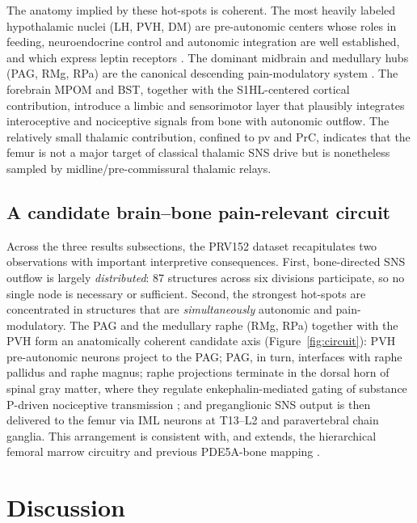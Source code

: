 \documentclass[11pt]{article}
\begin{document}
The anatomy implied by these hot-spots is coherent. The most heavily labeled hypothalamic nuclei (LH, PVH, DM) are pre-autonomic centers whose roles in feeding, neuroendocrine control and autonomic integration are well established, and which express leptin receptors \citep{flak2016cns}. The dominant midbrain and medullary hubs (PAG, RMg, RPa) are the canonical descending pain-modulatory system \citep{francois2017brainstem,heinricher2009descending}. The forebrain MPOM and BST, together with the S1HL-centered cortical contribution, introduce a limbic and sensorimotor layer that plausibly integrates interoceptive and nociceptive signals from bone with autonomic outflow. The relatively small thalamic contribution, confined to pv and PrC, indicates that the femur is not a major target of classical thalamic SNS drive but is nonetheless sampled by midline/pre-commissural thalamic relays.

\subsection{A candidate brain--bone pain-relevant circuit}

Across the three results subsections, the PRV152 dataset recapitulates two observations with important interpretive consequences. First, bone-directed SNS outflow is largely \emph{distributed}: 87 structures across six divisions participate, so no single node is necessary or sufficient. Second, the strongest hot-spots are concentrated in structures that are \emph{simultaneously} autonomic and pain-modulatory. The PAG and the medullary raphe (RMg, RPa) together with the PVH form an anatomically coherent candidate axis (Figure~\ref{fig:circuit}): PVH pre-autonomic neurons project to the PAG; PAG, in turn, interfaces with raphe pallidus and raphe magnus; raphe projections terminate in the dorsal horn of spinal gray matter, where they regulate enkephalin-mediated gating of substance P-driven nociceptive transmission \citep{francois2017brainstem,heinricher2009descending,benarroch2012postural}; and preganglionic SNS output is then delivered to the femur via IML neurons at T13--L2 and paravertebral chain ganglia. This arrangement is consistent with, and extends, the hierarchical femoral marrow circuitry and previous PDE5A-bone mapping \citep{kim2020pde5a}.

\section{Discussion}\label{sec:discussion}
\end{document}
